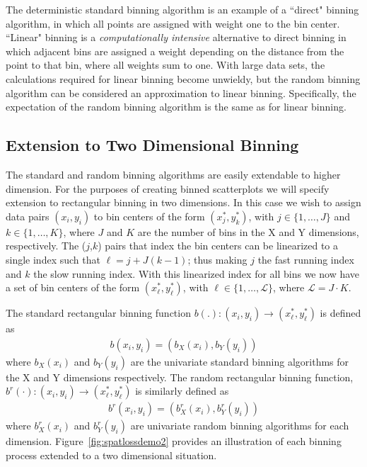 \documentclass[11pt]{isuthesis}\usepackage[]{graphicx}\usepackage[]{color}
\begin{document}
The deterministic standard binning algorithm is an example of a ``direct" binning algorithm, in which all points are assigned with weight one to the bin center. ``Linear" binning  \citep{martin-gold} is a \textit{computationally intensive} alternative to direct binning in which adjacent bins are assigned a weight depending on the distance from the point to that bin, where all weights sum to one.  With large data sets, the calculations required for linear binning become unwieldy, but the random binning algorithm can be considered an approximation to linear binning. Specifically, the expectation of the random binning algorithm is the same as for linear binning.

\subsection{Extension to Two Dimensional Binning}
\label{TwoDimBin}

The standard and random binning algorithms are easily extendable to higher dimension. For the purposes of creating binned scatterplots we will specify extension to rectangular binning in two dimensions. In this case we wish to assign data pairs $(x_i, y_i)$ to bin centers of the form $(x_j^\ast,y_k^\ast)$, with $j \in \{1,\dots,J\}$ and $k \in \{1,\dots,K\}$, where $J$ and $K$ are the number of bins in the X and Y dimensions, respectively. The ($j$,$k$) pairs that index the bin centers can be linearized to a single index such that $\ell = j + J(k-1)$; thus making $j$ the fast running index and $k$ the slow running index.  With this linearized index for all bins we now have a set of bin centers of the form $(x_\ell^\ast,y_\ell^\ast)$, with $\ell \in \{1,\dots,\mathscr{L}\}$, where $\mathscr{L}=J\cdot K$.

The standard rectangular binning function $b(.) : (x_i,y_i) \rightarrow (x^\ast_\ell,y^\ast_\ell)$ is defined as 
%
\begin{eqnarray}\label{standrecbin1}
b(x_i,y_i) = (b_X(x_i),b_Y(y_i))
\end{eqnarray}
%
where $b_X(x_i)$ and $b_Y(y_i)$ are the univariate standard binning algorithms for the X and Y dimensions respectively. The random rectangular binning function, $b^r(\cdot): (x_i,y_i) \rightarrow (x^\ast_\ell,y^\ast_\ell)$ is similarly defined as
%
\begin{eqnarray}\label{randrecbin1}
b^r(x_i,y_i) = (b^r_X(x_i),b^r_Y(y_i))
\end{eqnarray}
%
where $b^r_X(x_i)$ and $b^r_Y(y_i)$ are univariate random binning algorithms for each dimension. Figure~\ref{fig:spatlossdemo2} provides an illustration of each binning process extended to a two dimensional situation.
\end{document}
